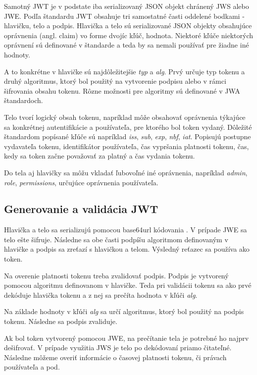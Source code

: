 Samotný JWT je v podstate iba serializovaný JSON objekt chránený JWS alebo JWE. Podľa štandardu JWT obsahuje tri samostatné časti oddelené bodkami - hlavičku, telo a podpis. Hlavička a telo sú serializované JSON objekty obsahujúce oprávnenia (angl. claim) vo forme dvojíc kľúč, hodnota. Niektoré kľúče niektorých oprávnení sú definované v štandarde a teda by sa nemali používať pre žiadne iné hodnoty. 

A to konkrétne v hlavičke sú najdôležitejšie \textit{typ} a \textit{alg}. Prvý určuje typ tokenu a druhý algoritmus, ktorý bol použitý na vytvorenie podpisu alebo v rámci šifrovania obsahu tokenu. Rôzne možnosti pre algoritmy sú definované v JWA štandardoch.

Telo tvorí logický obsah tokenu, napríklad môže obsahovať oprávnenia týkajúce sa konkrétnej autentifikácie a používateľa, pre ktorého bol token vydaný. Dôležité štandardom popísané kľúče sú napríklad \textit{iss}, \textit{sub}, \textit{exp}, \textit{nbf}, \textit{iat}. Popisujú postupne vydavateľa tokenu, identifikátor používateľa, čas vypršania platnosti tokenu, čas, kedy sa token začne považovať za platný a čas vydania tokenu.

Do tela aj hlavičky sa môžu vkladať ľubovoľné iné oprávnenia, napríklad \textit{admin}, \textit{role}, \textit{permissions}, určujúce oprávnenia používateľa.

\subsection{Generovanie a validácia JWT}

Hlavička a telo sa serializujú pomocou base64url kódovania \cite{base64_rfc}. V prípade JWE sa telo ešte šifruje. Následne sa obe časti podpíšu algoritmom definovaným v hlavičke a podpis sa zreťazí s hlavičkou a telom. Výsledný reťazec sa používa ako token.

Na overenie platnosti tokenu treba zvalidovať podpis. Podpis je vytvorený pomocou algoritmu definovanom v hlavičke. Teda pri validácii tokenu sa ako prvé dekóduje hlavička tokenu a z nej sa prečíta hodnota v kľúči \textit{alg}.

Na základe hodnoty v kľúči \textit{alg} sa určí algoritmus, ktorý bol použitý na podpis tokenu. Následne sa podpis zvaliduje. 

Ak bol token vytvorený pomocou JWE, na prečítanie tela je potrebné ho najprv dešifrovať. V prípade využitia JWS je telo po dekódovaní priamo čitateľné. Následne môžeme overiť informácie o časovej platnosti tokenu, či právach používateľa a pod.

